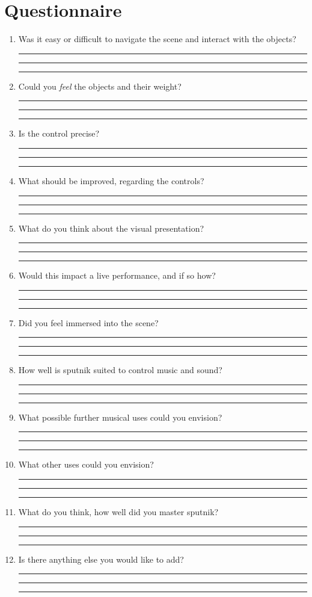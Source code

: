 \documentclass[10pt,a4paper]{scrartcl}
\begin{document}
\section{Questionnaire}
\begin{enumerate}
\item Was it easy or difficult to navigate the scene and interact with the objects?\\
\rule{\linewidth}{0.25pt}
\rule{\linewidth}{0.25pt}
\rule{\linewidth}{0.25pt}

\item Could you \emph{feel} the objects and their weight?\\
\rule{\linewidth}{0.25pt}
\rule{\linewidth}{0.25pt}
\rule{\linewidth}{0.25pt}

\item Is the control precise?\\
\rule{\linewidth}{0.25pt}
\rule{\linewidth}{0.25pt}
\rule{\linewidth}{0.25pt}

\item What should be improved, regarding the controls?\\
\rule{\linewidth}{0.25pt}
\rule{\linewidth}{0.25pt}
\rule{\linewidth}{0.25pt}

\item What do you think about the visual presentation?\\
\rule{\linewidth}{0.25pt}
\rule{\linewidth}{0.25pt}
\rule{\linewidth}{0.25pt}

\item Would this impact a live performance, and if so how?\\
\rule{\linewidth}{0.25pt}
\rule{\linewidth}{0.25pt}
\rule{\linewidth}{0.25pt}

\item Did you feel immersed into the scene?\\
\rule{\linewidth}{0.25pt}
\rule{\linewidth}{0.25pt}
\rule{\linewidth}{0.25pt}

\item How well is sputnik suited to control music and sound?\\
\rule{\linewidth}{0.25pt}
\rule{\linewidth}{0.25pt}
\rule{\linewidth}{0.25pt}

\item What possible further musical uses could you envision?\\
\rule{\linewidth}{0.25pt}
\rule{\linewidth}{0.25pt}
\rule{\linewidth}{0.25pt}

\item What other uses could you envision?\\
\rule{\linewidth}{0.25pt}
\rule{\linewidth}{0.25pt}
\rule{\linewidth}{0.25pt}

\item What do you think, how well did you master sputnik?\\
\rule{\linewidth}{0.25pt}
\rule{\linewidth}{0.25pt}
\rule{\linewidth}{0.25pt}

\item Is there anything else you would like to add?\\
\rule{\linewidth}{0.25pt}
\rule{\linewidth}{0.25pt}
\rule{\linewidth}{0.25pt}
\end{enumerate}
\end{document}

